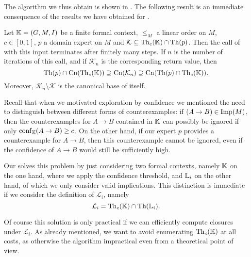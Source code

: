The algorithm we thus obtain is shown in
.  The following result is an immediate
consequence of the results we have obtained for .

\begin{Corollary}
  \label{cor:exploration-by-confidence-first-version}
  Let ${\mathbb{K}} = (G, M, I)$ be a finite formal context, $\leq_{M}$ a linear order on $M$,
  $c \in [0,1]$, $p$ a domain expert on $M$ and $\mathcal{K} \subseteq \operatorname{Th}_{c}({\mathbb{K}})
  \cap \operatorname{Th}(p)$.  Then the call of  with
  this input terminates after finitely many steps.  If $n$ is the number of iterations of
  this call, and if $\mathcal{K}_{n}$ is the corresponding return value, then
  \begin{equation*}
    \operatorname{Th}(p) \cap \operatorname{Cn}(\operatorname{Th}_{c}({\mathbb{K}})) \supseteq \operatorname{Cn}(\mathcal{K}_{n}) \supseteq \operatorname{Cn}(\operatorname{Th}(p)
    \cap \operatorname{Th}_{c}({\mathbb{K}})).
  \end{equation*}
  Moreover, $\mathcal{K}_{n} \setminus \mathcal{K}$ is the canonical base of itself.
\end{Corollary}

Recall that when we motivated exploration by confidence we mentioned the need to
distinguish between different forms of counterexamples: if $(A \to B) \in \operatorname{Imp}(M)$, then
the counterexamples for $A \to B$ contained in ${\mathbb{K}}$ can possibly be ignored if only
$\operatorname{conf}_{{\mathbb{K}}}(A \to B) \ge c$.  On the other hand, if our expert $p$ provides a
counterexample for $A \to B$, then this counterexample cannot be ignored, even if the
confidence of $A \to B$ would still be sufficiently high.

Our  solves this problem by just
considering two formal contexts, namely ${\mathbb{K}}$ on the one hand, where we apply the
confidence threshold, and ${\mathbb{L}}_{i}$ on the other hand, of which we only consider valid
implications.  This distinction is immediate if we consider the definition of
$\mathcal{L}_{i}$, namely
\begin{equation*}
  \mathcal{L}_{i} = \operatorname{Th}_{c}({\mathbb{K}}) \cap \operatorname{Th}({\mathbb{L}}_{i}).
\end{equation*}

Of course this solution is only practical if we can efficiently compute closures under
$\mathcal{L}_{i}$.  As already mentioned, we want to avoid enumerating $\operatorname{Th}_{c}({\mathbb{K}})$
at all costs, as otherwise the algorithm impractical even from a theoretical point of
view.

